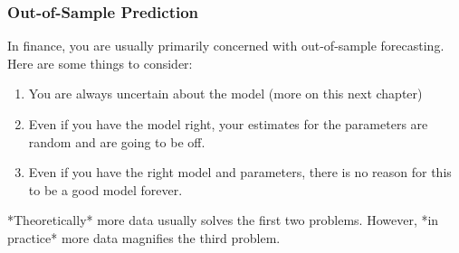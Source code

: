 \documentclass{beamer}
\begin{document}

\begin{frame}[fragile]
\frametitle{Out-of-Sample Prediction}

In finance, you are usually primarily concerned with out-of-sample forecasting. Here are some things to consider:

\begin{enumerate}
\item You are always uncertain about the model (more on this next chapter)
\item Even if you have the model right, your estimates for the parameters are random and are going to be off. 
\item Even if you have the right model and parameters, there is no reason for this to be a good model forever.
\end{enumerate}

*Theoretically* more data usually solves the first two problems. However, *in practice* more data magnifies the third problem.



\end{frame}
\end{document}

